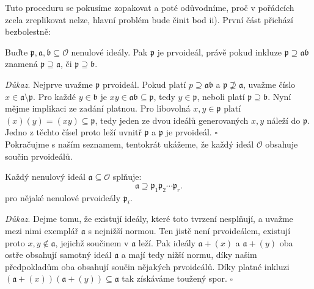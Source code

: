 \documentclass[12pt]{report}
\begin{document}
Tuto proceduru se pokusíme zopakovat a poté odůvodníme, proč v pořádcích zcela zreplikovat nelze, hlavní problém bude činit bod ii). První část přichází bezbolestně:

\begin{veta}\label{prvobsah}
Buďte $\mathfrak{p},\mathfrak{a},\mathfrak{b} \subseteq \mathcal{O}$ nenulové ideály. Pak $\mathfrak{p}$ je prvoideál, právě pokud inkluze $\mathfrak{p} \supseteq \mathfrak{a} \mathfrak{b}$ znamená $\mathfrak{p} \supseteq \mathfrak{a}$, či $\mathfrak{p} \supseteq \mathfrak{b}$.
\end{veta}

\noindent \textit{Důkaz}. Nejprve uvažme $\mathfrak{p}$ prvoideál. Pokud platí $p \supseteq \mathfrak{a} \mathfrak{b}$ a $\mathfrak{p} \not\supseteq \mathfrak{a}$, uvažme číslo $x \in \mathfrak{a} \setminus \mathfrak{p}$. Pro každé $y \in \mathfrak{b}$ je $xy \in \mathfrak{ab} \subseteq \mathfrak{p}$, tedy $y \in \mathfrak{p}$, neboli platí $\mathfrak{p} \supseteq \mathfrak{b}$. Nyní mějme implikaci ze zadání platnou. Pro libovolná $x,y \in \mathfrak{p}$ platí $ (x)(y) = (xy) \subseteq \mathfrak{p}$, tedy jeden ze dvou ideálů generovaných $x,y$ náleží do $\mathfrak{p}$. Jedno z těchto čísel proto leží uvnitř $\mathfrak{p}$ a $\mathfrak{p}$ je prvoideál. \hfill $\square$\\

Pokračujme s naším seznamem, tentokrát ukážeme, že každý ideál $\mathcal{O}$ obsahuje součin prvoideálů.

\begin{veta}\label{obsahprvo}
Každý nenulový ideál $\mathfrak{a} \subseteq \mathcal{O}$ splňuje:
\begin{equation*}
\mathfrak{a} \supseteq \mathfrak{p}_1 \mathfrak{p}_2 \cdots \mathfrak{p}_r.
\end{equation*}
pro nějaké nenulové prvoideály $\mathfrak{p}_i$.
\end{veta}

\noindent \textit{Důkaz}. Dejme tomu, že existují ideály, které toto tvrzení nesplňují, a uvažme mezi nimi exemplář $\mathfrak{a}$ s nejnižší normou. Ten jistě není prvoideálem, existují proto $x,y \not\in \mathfrak{a}$, jejichž součinem v $\mathfrak{a}$ leží. Pak ideály $\mathfrak{a}+(x)$ a $\mathfrak{a}+(y)$ oba ostře obsahují samotný ideál $\mathfrak{a}$ a mají tedy nižší normu, díky našim předpokladům oba obsahují součin nějakých prvoideálů. Díky platné inkluzi $(\mathfrak{a}+(x) ) (\mathfrak{a}+(y)) \subseteq \mathfrak{a}$ tak získáváme toužený spor. \hfill $\square$\\
\end{document}
